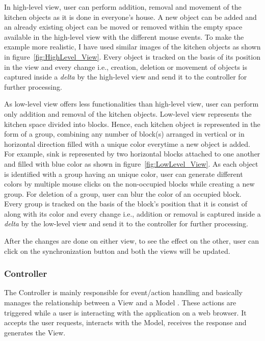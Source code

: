 In high-level view, user can perform addition, removal and movement of the kitchen objects as it is done in everyone's house. A new object can be added and an already existing object can be moved or removed within the empty space available in the high-level view with the different mouse events. To make the example more realistic, I have used similar images of the kitchen objects as shown in figure~\ref{fig:HighLevel_View}. Every object is tracked on the basis of its position in the view and every change i.e., creation, deletion or movement of objects is captured inside a \textit{delta} by the high-level view and send it to the controller for further processing.

As low-level view offers less functionalities than high-level view, user can perform only addition and removal of the kitchen objects. Low-level view represents the kitchen space divided into blocks. Hence, each kitchen object is represented in the form of a group, combining any number of block(s) arranged in vertical or in horizontal direction filled with a unique color everytime a new object is added. For example, sink is represented by two horizontal blocks attached to one another and filled with {\color{blue} blue} color as shown in figure~\ref{fig:LowLevel_View}. As each object is identified with a group having an unique color, user can generate different colors by multiple mouse clicks on the non-occupied blocks while creating a new group. For deletion of a group, user can blur the color of an occupied block. Every group is tracked on the basis of the block's position that it is consist of along with its color and every change i.e., addition or removal is captured inside a \textit{delta} by the low-level view and send it to the controller for further processing.

After the changes are done on either view, to see the effect on the other, user can click on the synchronization button and both the views will be updated.
 
\subsubsection{Controller}\label{subsubsec:design_controller}
The Controller is mainly responsible for event/action handling and basically manages the relationship between a View and a Model \cite{mdd-webwithmvc}. These actions are triggered while a user is interacting with the application on a web browser. It accepts the user requests, interacts with
the Model, receives the response and generates the View.

